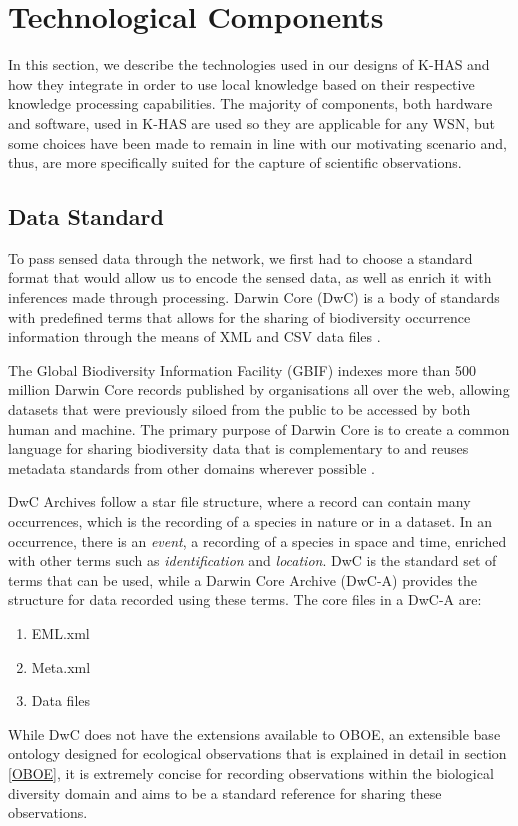 	\section{Technological Components}\label{arch:tech}
	In this section, we describe the technologies used in our designs of K-HAS and how they integrate in order to use local knowledge based on their respective knowledge processing capabilities. The majority of components, both hardware and software, used in K-HAS are used so they are applicable for any WSN, but some choices have been made to remain in line with our motivating scenario and, thus, are more specifically suited for the capture of scientific observations.
	
	\subsection{Data Standard}\label{arch:tech:dwc}
		To pass sensed data through the network, we first had to choose a standard format that would allow us to encode the sensed data, as well as enrich it with inferences made through processing. Darwin Core (DwC) is a body of standards with predefined terms that allows for the sharing of biodiversity occurrence information through the means of XML and CSV data files \cite{wieczorek2012}.

The Global Biodiversity Information Facility (GBIF)\cite{gbif} indexes more than 500 million Darwin Core records published by organisations all over the web, allowing datasets that were previously siloed from the public to be accessed by both human and machine. The primary purpose of Darwin Core is to create a common language for sharing biodiversity data that is complementary to and reuses metadata standards from other domains wherever possible \cite{wieczorek2012}.

DwC Archives follow a star file structure, where a record can contain many occurrences, which is the recording of a species in nature or in a dataset. In an occurrence, there is an \textit{event}, a recording of a species in space and time, enriched with other terms such as \textit{identification} and \textit{location}. DwC is the standard set of terms that can be used, while a Darwin Core Archive (DwC-A) provides the structure for data recorded using these terms. The core files in a DwC-A are:
\begin{enumerate}
	\item EML.xml
	\item Meta.xml
	\item Data files
\end{enumerate}
While DwC does not have the extensions available to OBOE, an extensible base ontology designed for ecological observations that is explained in detail in section \ref{OBOE}, it is extremely concise for recording observations within the biological diversity domain and aims to be a standard reference for sharing these observations.

